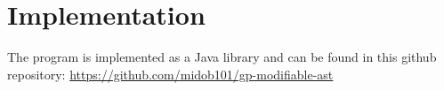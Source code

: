 \section{Implementation}

The program is implemented as a Java library and can be found in this github repository: \url{https://github.com/midob101/gp-modifiable-ast}









